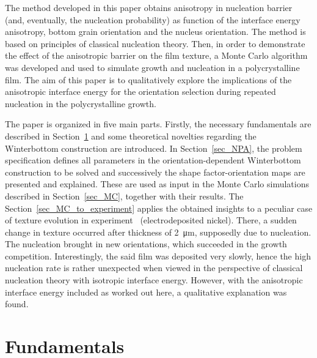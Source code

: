 The method developed in this paper obtains anisotropy in nucleation barrier (and, eventually, the nucleation probability) as function of the interface energy anisotropy, bottom grain orientation and the nucleus orientation. The method is based on principles of classical nucleation theory. Then, in order to demonstrate the effect of the anisotropic barrier on the film texture, a Monte Carlo algorithm was developed and used to simulate growth and nucleation in a polycrystalline film. The aim of this paper is to qualitatively explore the implications of the anisotropic interface energy for the orientation selection during repeated nucleation in the polycrystalline growth. 

The paper is organized in five main parts. Firstly, the necessary fundamentals are described in Section~\ref{sec_NPA_Fundamentals} and some theoretical novelties regarding the Winterbottom construction are introduced. In Section~\ref{sec_NPA}, the problem specification defines all parameters in the orientation-dependent Winterbottom construction to be solved and successively the shape factor-orientation maps are presented and explained. These are used as input in the Monte Carlo simulations described in Section~\ref{sec_MC}, together with their results. The Section~\ref{sec_MC_to_experiment} applies the obtained insights to a peculiar case of texture evolution in experiment~\cite{Alimadadi2016} (electrodeposited nickel). There, a sudden change in texture occurred after thickness of \qty{2}{\um}, supposedly due to nucleation. The nucleation brought in new orientations, which succeeded in the growth competition. Interestingly, the said film was deposited very slowly, hence the high nucleation rate is rather unexpected when viewed in the perspective of classical nucleation theory with isotropic interface energy. However, with the anisotropic interface energy included as worked out here, a qualitative explanation was found. 

\section{Fundamentals}\label{sec_NPA_Fundamentals}
